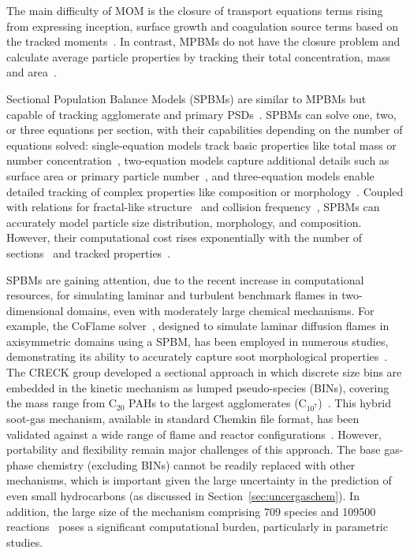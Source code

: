 The main difficulty of MOM is the closure of transport equations terms rising from expressing inception, surface growth and coagulation source terms based on the tracked moments~\citep{frenklach2002method}. In contrast, MPBMs do not have the closure problem and calculate average particle properties by tracking their total concentration, mass \citep{kruis1993simple} and area~\citep{tsantilis2004soft, lindstedt1994simplified}. 

Sectional Population Balance Models (SPBMs) are similar to MPBMs but capable of tracking agglomerate and primary PSDs~\citep{Xiong1993}. SPBMs can solve one, two, or three equations per section, with their capabilities depending on the number of equations solved: single-equation models track basic properties like total mass or number concentration~\citep{gelbard1980sectional}, two-equation models capture additional details such as surface area or primary particle number~\citep{park2004novel}, and three-equation models enable detailed tracking of complex properties like composition or morphology~\citep{kholghy2016core}. Coupled with relations for fractal-like structure~\citep{matsoukas1991dynamics} and collision frequency~\citep{fuchs1964mechanics}, SPBMs can accurately model particle size distribution, morphology, and composition. However, their computational cost rises exponentially with the number of sections~\citep{xiong1993formation} and tracked properties~\citep{kholghy2016core}.

 
SPBMs are gaining attention, due to the recent increase in computational resources, for simulating laminar and turbulent benchmark flames in two-dimensional domains, even with moderately large chemical mechanisms. For example, the CoFlame solver~\citep{eaves2016coflame}, designed to simulate laminar diffusion flames in axisymmetric domains using a SPBM, has been employed in numerous studies, demonstrating its ability to accurately capture soot morphological properties~\citep{dworkin2011application, liu2015numerical}. The CRECK group developed a sectional approach in which discrete size bins are embedded in the kinetic mechanism as lumped pseudo-species (BINs), covering the mass range from $\mathrm{C_{20}}$ PAHs to the largest agglomerates ($\mathrm{C_{10^7}}$)~\citep{cuoci2015opensmoke++, cuoci2013computational}. This hybrid soot-gas mechanism, available in standard Chemkin file format, has been validated against a wide range of flame and reactor configurations~\cite{ramalli2023automatic}. However, portability and flexibility remain major challenges of this approach. The base gas-phase chemistry (excluding BINs) cannot be readily replaced with other mechanisms, which is important given the large uncertainty in the prediction of even small hydrocarbons (as discussed in Section~\ref{sec:uncergaschem}). In addition, the large size of the mechanism comprising 709 species and 109500 reactions~\citep{nobili2022modeling} poses a significant computational burden, particularly in parametric studies.


